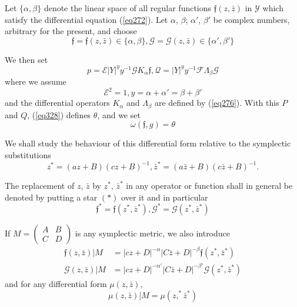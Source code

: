  Let $\{ \alpha, \beta\}$ denote the linear space of all regular
 functions $\mathfrak{f} (z, \bar{z})$ in $\mathscr{Y}$ which satisfy
 the differential equation (\ref{eq272}). Let $\alpha$, $\beta$; $\alpha'$,
 $\beta'$ be complex numbers, arbitrary for the present, and choose  
 \begin{equation*}
\mathfrak{f} = \mathfrak{f} (z, \bar {z}) \in \{\alpha, \beta \},
\mathcal{G} = \mathcal{G} (z, \bar {z}) \in \{\alpha', \beta' \}
\tag{331}\label{eq331}   
 \end{equation*}\pageoriginale 
 
 We then set 
 \begin{equation*} 
p = \mathcal{E} |Y|^y y^{-1} \mathcal{G} K_{\alpha}
\mathfrak{f}, \mathcal{Q} = |Y|^y y^{-1} \mathcal{F}
\Lambda_{\beta} \mathcal{G} \tag{332}\label{eq332}   
 \end{equation*} 
 where we assume 
 \begin{equation*}
\mathcal{E}^2 = 1, y = \alpha + \alpha' = \beta + \beta'
\tag{333}\label{eq333}   
 \end{equation*} 
 and the differential operators $K_\alpha $ and $\Lambda_\beta$ are
 defined by (\ref{eq276}). With this $P$ and $Q$, (\ref{eq328})
 defines $\theta $,  and we set   
 \begin{equation*}
\omega (\mathfrak{f}, g) = \theta \tag{334}\label{eq334}  
 \end{equation*} 
 
 We shall study the behaviour of this differential form relative to
 the symplectic substitutions 
 $$
 z^* = (az + B ) (cz + B)^{-1}, \bar{z}^* = (a\bar{z} + B ) (c\bar{z}
 + B)^{-1}. 
 $$
 
 The replacement of $z$, $\bar{z}$ by $z^*$, $\bar{z}^*$ in any operator
 or function shall in general be denoted by putting a star $(*)$ over
 it and in particular  
 $$
 \mathfrak{f}^* = \mathfrak{f} (z^* , \bar{z}^*), \mathcal{G}^* =
 \mathcal{G} (z^*, \bar{z}^*) 
 $$
 
 If $M = \begin{pmatrix} A & B \\ C & D  \end {pmatrix}$ is any
 symplectic metric, we also introduce  
 \begin{align*}
\mathfrak{f} (z, \bar{z}) | M & = |c z + D|^{- \alpha } | C \bar{z} +
D|^{- \beta} \mathfrak{f} (z^*, \bar{z}^*)\\ 
\mathcal{G} (z, \bar{z}) | M & = |c z + D|^{- \alpha '} | C \bar{z} +
D|^{- \beta'} \mathcal{G} (z^*, \bar{z}^*) 
 \end{align*} 
 and for any differential form $\mu (z, \bar{z})$,
 \begin{equation*}
\mu (z, \bar{z}) | M = \mu (z,^* \bar{z}^*) \tag{335}\label{eq335}  
 \end{equation*}\pageoriginale 
 
